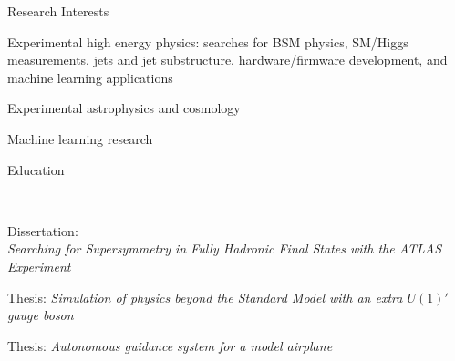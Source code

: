 \documentclass{resume}
\begin{document}

\begin{rsection}{Research Interests}
  \begin{rlist}
    \item Experimental high energy physics: searches for BSM physics, SM/Higgs measurements, jets and jet substructure, hardware/firmware development, and machine learning applications
    \item Experimental astrophysics and cosmology
    \item Machine learning research
  \end{rlist}
\end{rsection}


\begin{rsection}{Education}

  \\
  \vspace{-0.2em}
  \item Dissertation: \\{\em Searching for Supersymmetry in Fully Hadronic Final States with the ATLAS Experiment}


  \vspace{-0.2em}
  \item Thesis: {\em Simulation of physics beyond the Standard Model with an extra $U(1)'$ gauge boson}




  \vspace{-0.2em}
  \item Thesis: {\em Autonomous guidance system for a model airplane}

\end{rsection}
\end{document}
